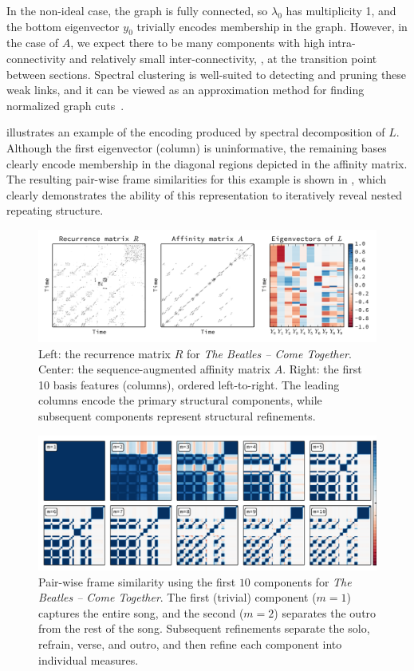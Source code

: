 \documentclass{article}
\begin{document}
In the non-ideal case, the graph is fully connected, so
$\lambda_0$ has multiplicity 1, and the bottom eigenvector $y_0$ trivially encodes 
membership in the graph. 
However, in the case of $A$, we expect there to be many components
with high intra-connectivity and relatively small inter-connectivity, \eg, at the
transition point between sections.  Spectral clustering is well-suited to detecting
and pruning these weak links, and it can be viewed as an approximation method for
finding normalized graph cuts~\cite{von2007tutorial}.

 illustrates an example of the encoding produced by spectral
decomposition of $L$.  Although the first eigenvector (column) is uninformative, 
the remaining bases clearly encode membership in the diagonal regions depicted in the 
affinity matrix.  
The resulting pair-wise frame similarities for this example is shown in , 
which clearly demonstrates the ability of this representation to iteratively reveal 
nested repeating structure.

\begin{figure}[t]
\centering
\includegraphics[width=\textwidth]{figs/recurrence}
\caption{Left: the recurrence matrix $R$ for \emph{The Beatles -- Come
Together}. Center: the sequence-augmented affinity matrix $A$.
Right: the first 10 basis features (columns), ordered left-to-right.  
The leading columns encode the primary structural components, while subsequent
components represent structural refinements.\label{recurrence}}
\end{figure}

 
\begin{figure}[t]
\centering
\includegraphics[width=\textwidth]{figs/lowrank}
\caption{Pair-wise frame similarity using the first $10$ components for \emph{The Beatles -- Come Together}.  The first
(trivial) component ($m=1$) captures the entire song, and the second ($m=2$) separates
the outro from the rest of the song.  Subsequent refinements separate the solo,
refrain, verse, and outro, and then refine each component into individual measures.\label{lowrank}}
\end{figure}
\end{document}
